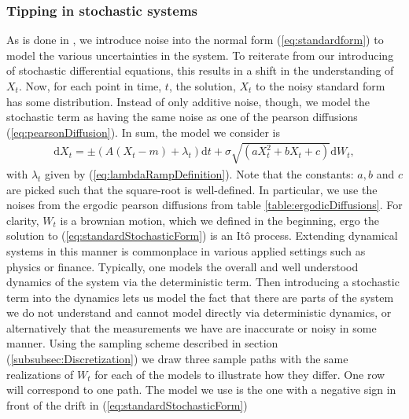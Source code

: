 \subsubsection{Tipping in stochastic systems}
As is done in \cite[equation (1)]{Ditlevsen2023}, we introduce noise into the normal form (\ref{eq:standardform}) to model the various uncertainties in the system. To reiterate from our introducing of stochastic differential equations, this results in a shift in the understanding of $X_t$. Now, for each point in time, $t$, the solution, $X_t$ to the noisy standard form has some distribution. Instead of only additive noise, though, we model the stochastic term as having the same noise as one of the pearson diffusions (\ref{eq:pearsonDiffusion}). In sum, the model we consider is
\begin{align}
    \mathrm{d}X_t = \pm\left(A\left(X_t - m\right) + \lambda_t\right)\mathrm{d}t + \sigma\sqrt{\left(aX_t^2 + bX_t + c\right)}\mathrm{d}W_t, \label{eq:standardStochasticForm}
\end{align}
with $\lambda_t$ given by (\ref{eq:lambdaRampDefinition}). Note that the constants: $a, b$ and $c$ are picked such that the square-root is well-defined. In particular, we use the noises from the ergodic pearson diffusions from table \ref{table:ergodicDiffusions}. For clarity, $W_t$ is a brownian motion, which we defined in the beginning, ergo the solution to (\ref{eq:standardStochasticForm}) is an Itô process. Extending dynamical systems in this manner is commonplace in various applied settings such as physics or finance. Typically, one models the overall and well understood dynamics of the system via the deterministic term. Then introducing a stochastic term into the dynamics lets us model the fact that there are parts of the system we do not understand and cannot model directly via deterministic dynamics, or alternatively that the measurements we have are inaccurate or noisy in some manner. Using the sampling scheme described in section (\ref{subsubsec:Discretization}) we draw three sample paths with the same realizations of $W_t$ for each of the models to illustrate how they differ. One row will correspond to one path. The model we use is the one with a negative sign in front of the drift in (\ref{eq:standardStochasticForm})
